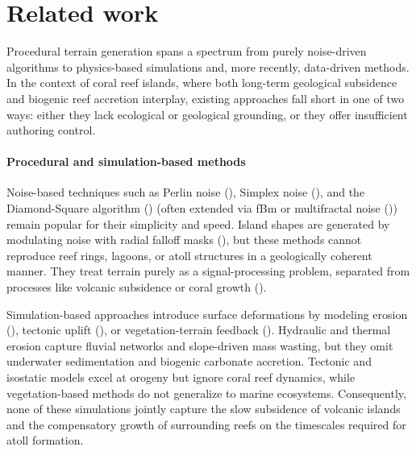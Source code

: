 \section{Related work}

Procedural terrain generation spans a spectrum from purely noise-driven algorithms to physics-based simulations and, more recently, data-driven methods. In the context of coral reef islands, where both long-term geological subsidence and biogenic reef accretion interplay, existing approaches fall short in one of two ways: either they lack ecological or geological grounding, or they offer insufficient authoring control.

\paragraph{Procedural and simulation-based methods}
Noise-based techniques such as Perlin noise (\cite{Perlin1985}), Simplex noise (\cite{Perlin2001}), and the Diamond-Square algorithm (\cite{Fournier1982}) (often extended via fBm or multifractal noise (\cite{Musgrave1989,Ebert2003})) remain popular for their simplicity and speed. Island shapes are generated by modulating noise with radial falloff masks (\cite{Olsen2004}), but these methods cannot reproduce reef rings, lagoons, or atoll structures in a geologically coherent manner. They treat terrain purely as a signal-processing problem, separated from processes like volcanic subsidence or coral growth (\cite{Smelik2009,Galin2019}).

Simulation-based approaches introduce surface deformations by modeling erosion (\cite{Benes2006,Neidhold2005,Mei2007}), tectonic uplift (\cite{Cordonnier2016,Cordonnier2017a,Schott2023}), or vegetation-terrain feedback (\cite{Ecormier-Nocca2021,Cordonnier2017b}). Hydraulic and thermal erosion capture fluvial networks and slope-driven mass wasting, but they omit underwater sedimentation and biogenic carbonate accretion. Tectonic and isostatic models excel at orogeny but ignore coral reef dynamics, while vegetation-based methods do not generalize to marine ecosystems. Consequently, none of these simulations jointly capture the slow subsidence of volcanic islands and the compensatory growth of surrounding reefs on the timescales required for atoll formation.

